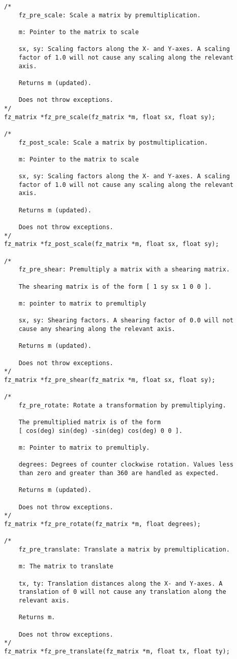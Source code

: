 \documentclass[oneside]{book}
\begin{document}
\begin{lstlisting}
/*
	fz_pre_scale: Scale a matrix by premultiplication.

	m: Pointer to the matrix to scale

	sx, sy: Scaling factors along the X- and Y-axes. A scaling
	factor of 1.0 will not cause any scaling along the relevant
	axis.

	Returns m (updated).

	Does not throw exceptions.
*/
fz_matrix *fz_pre_scale(fz_matrix *m, float sx, float sy);

/*
	fz_post_scale: Scale a matrix by postmultiplication.

	m: Pointer to the matrix to scale

	sx, sy: Scaling factors along the X- and Y-axes. A scaling
	factor of 1.0 will not cause any scaling along the relevant
	axis.

	Returns m (updated).

	Does not throw exceptions.
*/
fz_matrix *fz_post_scale(fz_matrix *m, float sx, float sy);

/*
	fz_pre_shear: Premultiply a matrix with a shearing matrix.

	The shearing matrix is of the form [ 1 sy sx 1 0 0 ].

	m: pointer to matrix to premultiply

	sx, sy: Shearing factors. A shearing factor of 0.0 will not
	cause any shearing along the relevant axis.

	Returns m (updated).

	Does not throw exceptions.
*/
fz_matrix *fz_pre_shear(fz_matrix *m, float sx, float sy);

/*
	fz_pre_rotate: Rotate a transformation by premultiplying.

	The premultiplied matrix is of the form
	[ cos(deg) sin(deg) -sin(deg) cos(deg) 0 0 ].

	m: Pointer to matrix to premultiply.

	degrees: Degrees of counter clockwise rotation. Values less
	than zero and greater than 360 are handled as expected.

	Returns m (updated).

	Does not throw exceptions.
*/
fz_matrix *fz_pre_rotate(fz_matrix *m, float degrees);

/*
	fz_pre_translate: Translate a matrix by premultiplication.

	m: The matrix to translate

	tx, ty: Translation distances along the X- and Y-axes. A
	translation of 0 will not cause any translation along the
	relevant axis.

	Returns m.

	Does not throw exceptions.
*/
fz_matrix *fz_pre_translate(fz_matrix *m, float tx, float ty);
\end{lstlisting}
\end{document}
